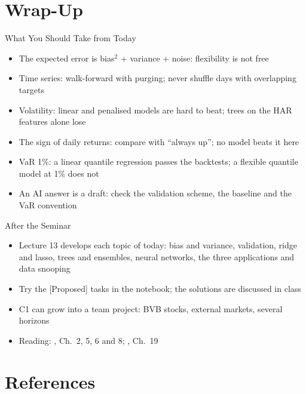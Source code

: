 \section{Wrap-Up}

\begin{frame}{What You Should Take from Today}
\itemsize{\small}
\begin{itemize}
    \item The expected error is bias$^2$ + variance + noise: flexibility is not free
    \item Time series: walk-forward with purging; never shuffle days with overlapping targets
    \item Volatility: linear and penalised models are hard to beat; trees on the HAR features alone lose
    \item The sign of daily returns: compare with ``always up''; no model beats it here
    \item VaR 1\%: a linear quantile regression passes the backtests; a flexible quantile model at 1\% does not
    \item An AI answer is a draft: check the validation scheme, the baseline and the VaR convention
\end{itemize}
\end{frame}

\begin{frame}{After the Seminar}
\itemsize{\small}
\begin{itemize}
    \item Lecture 13 develops each topic of today: bias and variance, validation, ridge and lasso, trees and ensembles, neural networks, the three applications and data snooping
    \item Try the [Proposed] tasks in the notebook; the solutions are discussed in class
    \item C1 can grow into a team project: BVB stocks, external markets, several horizons
    \item Reading: , Ch.~2, 5, 6 and 8; , Ch.~19
\end{itemize}
\end{frame}


\section{References}

